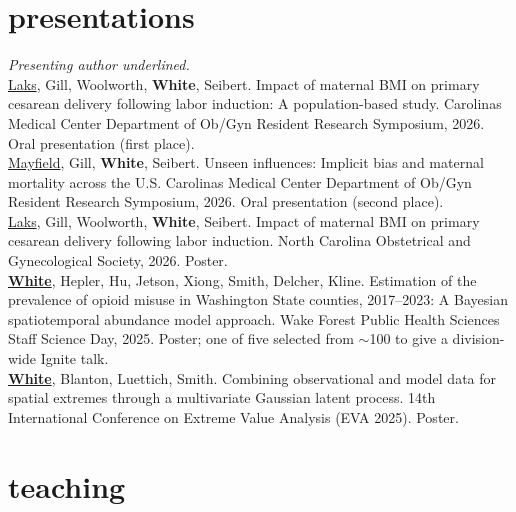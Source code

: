\documentclass[11pt, letterpaper]{article}
\begin{document}
\section{presentations}

{\footnotesize
{\color{subtle}\itshape Presenting author underlined.} \\[3pt]
\underline{Laks}, Gill, Woolworth, \textbf{White}, Seibert. Impact of maternal BMI on primary cesarean delivery following labor induction: A population-based study. Carolinas Medical Center Department of Ob/Gyn Resident Research Symposium, 2026. Oral presentation (first place). \\[2pt]
\underline{Mayfield}, Gill, \textbf{White}, Seibert. Unseen influences: Implicit bias and maternal mortality across the U.S. Carolinas Medical Center Department of Ob/Gyn Resident Research Symposium, 2026. Oral presentation (second place). \\[2pt]
\underline{Laks}, Gill, Woolworth, \textbf{White}, Seibert. Impact of maternal BMI on primary cesarean delivery following labor induction. North Carolina Obstetrical and Gynecological Society, 2026. Poster. \\[2pt]
\underline{\textbf{White}}, Hepler, Hu, Jetson, Xiong, Smith, Delcher, Kline. Estimation of the prevalence of opioid misuse in Washington State counties, 2017--2023: A Bayesian spatiotemporal abundance model approach. Wake Forest Public Health Sciences Staff Science Day, 2025. Poster; one of five selected from ${\sim}$100 to give a division-wide Ignite talk. \\[2pt]
\underline{\textbf{White}}, Blanton, Luettich, Smith. Combining observational and model data for spatial extremes through a multivariate Gaussian latent process. 14th International Conference on Extreme Value Analysis (EVA 2025). Poster.
}

\section{teaching}
\end{document}
